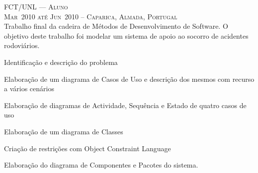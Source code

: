 \documentclass[a4paper,fontsize=10pt]{scrartcl} %
\begin{document}
\begin{minipage}[t]{0.5\textwidth}
\textsc{FCT/UNL --- Aluno}\\
\small\textsc{Mar~2010 até Jun~2010 -- Caparica, Almada, Portugal}\\ \normalsize
Trabalho final da cadeira de Métodos de Desenvolvimento de Software.
O objetivo deste trabalho foi modelar um sistema de apoio ao socorro de acidentes rodoviários.\\
\begin{inparaitem}
	\item[] Identificação e descrição do problema
	\item Elaboração de um diagrama de Casos de Uso e descrição dos mesmos com recurso a vários cenários
	\item Elaboração de diagramas de Actividade, Sequência e Estado de quatro casos de uso
	\item Elaboração de um diagrama de Classes
	\item Criação de restrições com Object Constraint Language
	\item Elaboração do diagrama de Componentes e Pacotes do sistema.
\end{inparaitem}
\\\par



\end{minipage}
\end{document}

